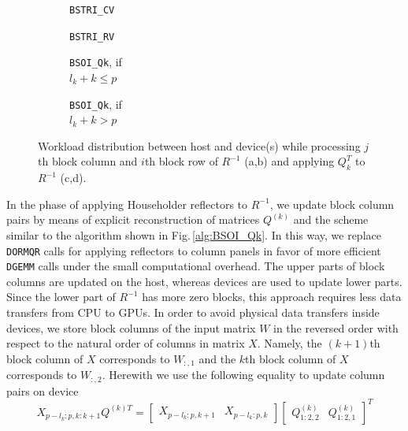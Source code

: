 \documentclass{llncs}
\newcommand{\Gemm}{\texttt{DGEMM}\xspace}
\begin{document}
\begin{figure}[t]
  \centering
  \begin{subfigure}[t]{0.2\linewidth}
    \scalebox{0.59}{}
    \caption{{\tt BSTRI\_CV} \label{fig:BSTRI_CV_HostDevice_workload}}
  \end{subfigure}
  \begin{subfigure}[t]{0.4\linewidth}
    \scalebox{0.59}{}
    \caption{{\tt BSTRI\_RV}\label{fig:BSTRI_RV_HostDevice_workload}}
  \end{subfigure}
  \begin{subfigure}[t]{0.17\linewidth}
    \scalebox{0.59}{}
    \caption{{\tt BSOI\_Qk}, if \\$l_k + k \leq p$ \label{fig:BSOI_Qk_HostDevice_workload1}}
  \end{subfigure}
  \begin{subfigure}[t]{0.17\linewidth}
    \scalebox{0.59}{}
    \caption{{\tt BSOI\_Qk}, if \\$l_k + k > p$ \label{fig:BSOI_Qk_HostDevice_workload2}}
  \end{subfigure}

  \caption[]{Workload distribution between host and device(s) 
    while processing 
    $j$th block column and $i$th block row of $R^{-1}$ (a,b) 
    and applying $Q_k^T$ to $R^{-1}$ (c,d).\footnotemark}
  \label{fig:HostDevice_workload}
\end{figure}

In the phase of applying Householder reflectors to $R^{-1}$,
we update block column pairs by means of 
explicit reconstruction of matrices $Q^{(k)}$
and the scheme similar to the algorithm shown in Fig.\,\ref{alg:BSOI_Qk}.
In this way, 
we replace {\tt DORMQR} calls for applying reflectors to column panels 
in favor of more efficient \Gemm calls
under the small computational overhead.
The upper parts of block columns are updated on the host, 
whereas devices are used to update lower parts. 
Since the lower part of $R^{-1}$ has more zero blocks,
this approach requires less data transfers from CPU to GPUs.
In order to avoid physical data transfers inside devices,
we store block columns of the input matrix $W$ in the reversed order 
with respect to the natural order of columns in matrix $X$. 
Namely, the $(k+1)$th block column of $X$ 
corresponds to ${W}_{:,1}$ and 
the $k$th block column of $X$ 
corresponds to ${W}_{:,2}$.
Herewith we use the following equality to update column pairs on device 
\begin{equation}
  \label{BSOI_device_update}
    X_{p-l_k:p,k:k+1}   Q^{{(k)}T} = 
    \begin{bmatrix}
      X_{p-l_k:p,k+1} & X_{p-l_k:p,k}
    \end{bmatrix} 
    \begin{bmatrix}
      Q^{(k)}_{1:2,2} & Q^{(k)}_{1:2,1}
    \end{bmatrix}^T  
\end{equation}
\end{document}
